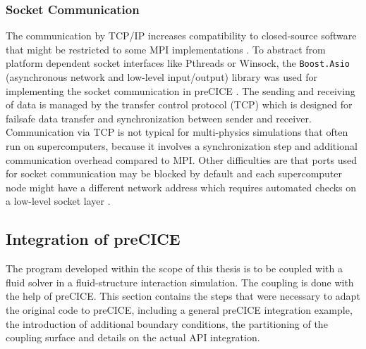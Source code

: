  \subsubsection{Socket Communication}\label{sec:Coupl-Communication-TCP}
   The communication by TCP/IP increases compatibility to closed-source software that might be restricted to some MPI implementations \cite{bungartz2015fully}. To abstract from platform dependent socket interfaces like Pthreads or Winsock, the \texttt{Boost.Asio} (asynchronous network and low-level input/output) library was used for implementing the socket communication in preCICE \cite{gatzhammer2015efficient}. The sending and receiving of data is managed by the transfer control protocol (TCP) which is designed for failsafe data transfer and synchronization between sender and receiver. Communication via TCP is not typical for multi-physics simulations that often run on supercomputers, because it involves a synchronization step and additional communication overhead compared to MPI. Other difficulties are that ports used for socket communication may be blocked by default and each supercomputer node might have a different network address which requires automated checks on a low-level socket layer \cite{gatzhammer2015efficient}.


 \subsection{Integration of preCICE}\label{sec:Coupl-Impl}
  The program developed within the scope of this thesis is to be coupled with a fluid solver in a fluid-structure interaction simulation. The coupling is done with the help of preCICE. This section contains the steps that were necessary to adapt the original code to preCICE, including a general preCICE integration example, the introduction of additional boundary conditions, the partitioning of the coupling surface and details on the actual API integration.
  
  

